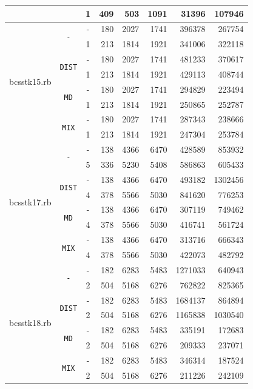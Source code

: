 \documentclass{ctuthesis}
\theoremstyle{plain}
\theoremstyle{definition}
\begin{document}
{\begin{tabular}{|l|c|c|r|r|r|r|r|}
	& & 1 &	409	&	503	  &	1091 &	31396	&	107946	\\
\hline
\multirow{8}{*}{bcsstk15.rb}
	& \multirow{2}{*}{\texttt{-}}
  	& -	  & 180	& 2027  & 1741 & 396378	&	267754	\\
	& & 1 	&	213	&	1814	&	1921	&	341006	&	322118	\\
	& \multirow{2}{*}{\texttt{DIST}}
  	& -	  & 180	& 2027  & 1741 & 481233	&	370617	\\
	& & 1 	&	213	&	1814	&	1921	&	429113	&	408744	\\
	& \multirow{2}{*}{\texttt{MD}}
  	& -	  & 180	& 2027  & 1741 & 294829	&	223494	\\
	& & 1 	&	213	&	1814	&	1921	&	250865	&	252787	\\
	& \multirow{2}{*}{\texttt{MIX}}
  	& -	  & 180	& 2027  & 1741 & 287343	&	238666	\\
	& & 1 	&	213	&	1814	&	1921	&	247304	&	253784	\\
\hline
\multirow{8}{*}{bcsstk17.rb}
	& \multirow{2}{*}{\texttt{-}}
  	& -	& 138	& 4366  & 6470  &  428589	&	853932	\\
	& & 5	&	336	&	5230	&	5408	&	586863	&	605433	\\
	& \multirow{2}{*}{\texttt{DIST}}
  	& -	& 138	& 4366  & 6470  & 493182	&	1302456	\\
	& & 4	&	378	&	5566	&	5030	&	841620	&	776253	\\
	& \multirow{2}{*}{\texttt{MD}}
  	& -	& 138	& 4366  & 6470  & 307119	&	749462	\\
	& & 4	&	378	&	5566	&	5030	&	416741	&	561724	\\
	& \multirow{2}{*}{\texttt{MIX}}
  	& -	& 138	& 4366  & 6470  & 313716	&	666343	\\
	& & 4	&	378	&	5566	&	5030	&	422073	&	482792	\\
\hline
\multirow{8}{*}{bcsstk18.rb}
	& \multirow{2}{*}{\texttt{-}}
    & -	& 182	& 6283  & 5483  & 1271033	&	640943	\\
	& & 2	&	504	&	5168	&	6276	&	762822	&	825365	\\
	& \multirow{2}{*}{\texttt{DIST}}
  	& -	& 182	& 6283  & 5483  & 1684137	&	864894	\\
	& & 2	&	504	&	5168	&	6276	&	1165838	&	1030540	\\
	& \multirow{2}{*}{\texttt{MD}}
  	& -	& 182	& 6283  & 5483  & 335191	&	172683	\\
	& & 2	&	504	&	5168	&	6276	&	209333	&	237071	\\
	& \multirow{2}{*}{\texttt{MIX}}
  	& -	& 182	& 6283  & 5483  & 346314	&	187524	\\
	& & 2	&	504	&	5168	&	6276	&	211226	&	242109	\\
\hline
\end{tabular}
}
\bigskip
\end{document}
